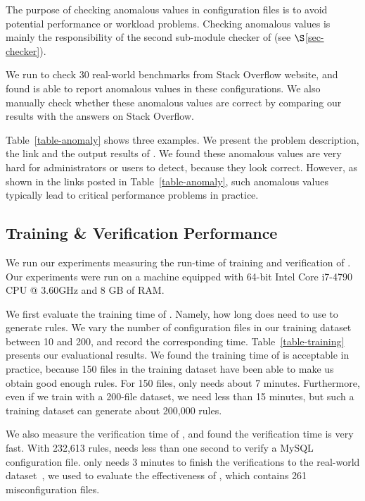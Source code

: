 The purpose of checking anomalous values in configuration files 
is to avoid potential performance or workload problems. 
Checking anomalous values is mainly the responsibility of
the second sub-module checker of \app (see $\S$\ref{sec-checker}).

We run \app to check 30 real-world benchmarks from Stack Overflow 
website, and found \app is able to report anomalous values in
these configurations. We also manually check whether these
anomalous values are correct by comparing our results with
the answers on Stack Overflow.

Table~\ref{table-anomaly} shows three examples.
We present the problem description, the link and the output results
of \app. We found these anomalous values are very hard for
administrators or users to detect, because they look correct.
However, as shown in the links posted in Table~\ref{table-anomaly},
such anomalous values typically lead to critical performance
problems in practice.

\subsection{Training \& Verification Performance}
\label{subsec-time}

We run our experiments measuring the run-time of training and
verification of \app.
Our experiments were run on a machine equipped with
64-bit Intel Core i7-4790 CPU @ 3.60GHz and 8 GB of RAM.

We first evaluate the training time of \app. Namely, how long
does \app need to use to generate rules.
We vary the number of configuration files in our training dataset
between 10 and 200, and record the corresponding time.
Table~\ref{table-training} presents our evaluational results.
We found the training time of \app is acceptable in practice,
because 150 files in the training dataset have been able to make
us obtain good enough rules.
For 150 files, \app only needs about 7 minutes.
Furthermore, even if we train \app with a 200-file dataset,
we need less than 15 minutes, but such a training dataset
can generate about 200,000 rules.

We also measure the verification time of \app, and found
the verification time is very fast. With 232,613 rules,
\app needs less than one second to verify a MySQL configuration file.
\app only needs 3 minutes to finish the verifications to
the real-world dataset~\cite{configdataset}, we used to 
evaluate the effectiveness of \app,
which contains 261 misconfiguration files. 

